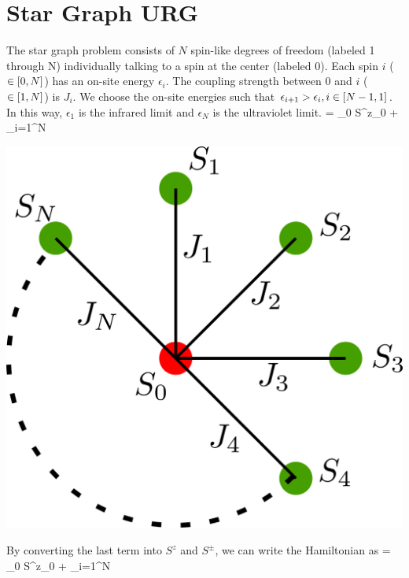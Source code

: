 \documentclass[12pt,twoside]{article}
\numberwithin{equation}{section}
\begin{document}
\section{Star Graph URG}
\begin{minipage}{260pt}
The star graph problem consists of \(N\) spin-like degrees of freedom (labeled 1 through N) individually talking to a spin at the center (labeled 0). Each spin \(i\) (\(\in \left[{0,N}\right]\)) has an on-site energy \(\epsilon_i\). The coupling strength between 0 and \(i\) (\(\in \left[{1,N}\right]\)) is \(J_i\). We choose the on-site energies such that \(\epsilon_{i+1} > \epsilon_i, i\in\left[{N-1,1}\right]\). In this way, \(\epsilon_1\) is the infrared limit and \(\epsilon_N\) is the ultraviolet limit.
\beq
\ham = \epsilon_0 S^z_0 + \sum_{i=1}^N
\eeq
\end{minipage}
\hspace*{20pt}
\begin{minipage}{200pt}
\begin{center}
\includegraphics[scale=0.2]{../figures/stargraph_.png}
\end{center}
\end{minipage}
\pb By converting the last term into \(S^z\) and \(S^\pm\), we can write the Hamiltonian as
\beq
\ham = \epsilon_0 S^z_0 + \sum_{i=1}^N
\end{document}
